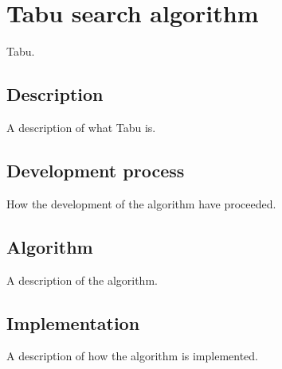 \section{Tabu search algorithm}
Tabu.
\subsection{Description}
A description of what Tabu is.
\subsection{Development process}
How the development of the algorithm have proceeded.
\subsection{Algorithm}
A description of the algorithm.
\subsection{Implementation}
A description of how the algorithm is implemented.

